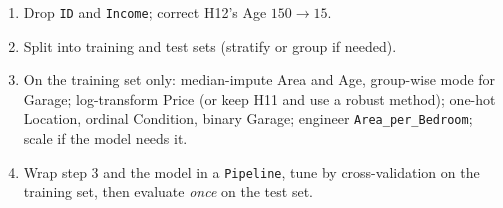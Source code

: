 \documentclass[11pt]{article}
\begin{document}
\begin{worked}
\small
\begin{enumerate}
  \item Drop \texttt{ID} and \texttt{Income}; correct H12's Age $150 \to 15$.
  \item Split into training and test sets (stratify or group if needed).
  \item On the training set only: median-impute Area and Age, group-wise
    mode for Garage; log-transform Price (or keep H11 and use a robust
    method); one-hot Location, ordinal Condition, binary Garage; engineer
    \texttt{Area\_per\_Bedroom}; scale if the model needs it.
  \item Wrap step 3 and the model in a \texttt{Pipeline}, tune by
    cross-validation on the training set, then evaluate \emph{once} on the
    test set.
\end{enumerate}
\end{worked}
\end{document}
